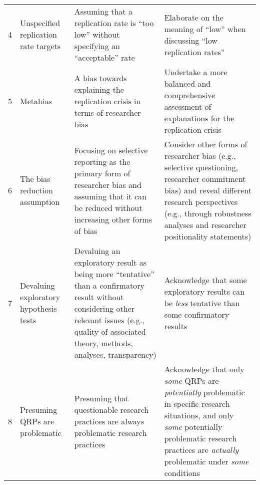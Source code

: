 \documentclass[authordate, meta]{jote-new-article}
\begin{document}
\begin{table*}
\begin{fullwidth}
\begin{tabularx}{\linewidth}{@{} l >{\RaggedRight\arraybackslash}p{12em} >{\RaggedRight\arraybackslash}X >{\RaggedRight\arraybackslash}X@{}}
      4  & Unspecified replication rate targets                                                                                                                                                                                                    & Assuming that a replication rate is “too low” without specifying an “acceptable” rate
         & Elaborate on the meaning of “low” when discussing “low replication rates”
      \\

      5  & Metabias                                                                                                                                                                                                                                & A bias towards explaining the replication crisis in terms of researcher bias
         & Undertake a more balanced and comprehensive assessment of explanations for the replication crisis
      \\

      6  & The bias reduction assumption                                                                                                                                                                                                           & Focusing on selective reporting as the primary form of researcher bias and assuming that it can be reduced without increasing other forms of bias
         & Consider other forms of researcher bias (e.g., selective questioning, researcher commitment bias) and reveal different research perspectives (e.g., through robustness analyses and researcher positionality statements)
      \\

      7  & Devaluing exploratory hypothesis tests                                                                                                                                                                                                  & Devaluing an exploratory result as being more “tentative” than a confirmatory result without considering other relevant issues (e.g., quality of associated theory, methods, analyses, transparency)
         & Acknowledge that some exploratory results can be \emph{less} tentative than some confirmatory results
      \\

      8  & Presuming QRPs are problematic                                                                                                                                                                                                          & Presuming that questionable research practices are always problematic research practices
         & Acknowledge that only \emph{some} QRPs are \emph{potentially} problematic in specific research situations, and only \emph{some} potentially problematic research practices are \emph{actually} problematic under \emph{some} conditions
      \\


\end{tabularx}
\end{fullwidth}
\end{table*}
\end{document}
